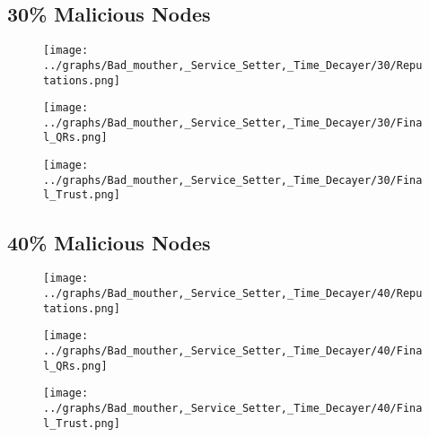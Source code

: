 \documentclass{article}
\begin{document}
  \begin{minipage}[t]{0.49\columnwidth}
    \subsection*{30\% Malicious Nodes}
        \begin{figure}[H]
            \centering
            \texttt{[image: ../graphs/Bad\_mouther,\_Service\_Setter,\_Time\_Decayer/30/Reputations.png]}
        \end{figure}
        \begin{figure}[H]
            \centering
            \texttt{[image: ../graphs/Bad\_mouther,\_Service\_Setter,\_Time\_Decayer/30/Final\_QRs.png]}
        \end{figure}
    \end{minipage}
    \begin{minipage}[t]{0.49\columnwidth}
        \begin{figure}[H]
            \centering
            \texttt{[image: ../graphs/Bad\_mouther,\_Service\_Setter,\_Time\_Decayer/30/Final\_Trust.png]}
        \end{figure}
    \end{minipage}

  \begin{minipage}[t]{0.49\columnwidth}
    \subsection*{40\% Malicious Nodes}
        \begin{figure}[H]
            \centering
            \texttt{[image: ../graphs/Bad\_mouther,\_Service\_Setter,\_Time\_Decayer/40/Reputations.png]}
        \end{figure}
        \begin{figure}[H]
            \centering
            \texttt{[image: ../graphs/Bad\_mouther,\_Service\_Setter,\_Time\_Decayer/40/Final\_QRs.png]}
        \end{figure}
    \end{minipage}
    \begin{minipage}[t]{0.49\columnwidth}
        \begin{figure}[H]
            \centering
            \texttt{[image: ../graphs/Bad\_mouther,\_Service\_Setter,\_Time\_Decayer/40/Final\_Trust.png]}
        \end{figure}
    \end{minipage}
\end{document}
